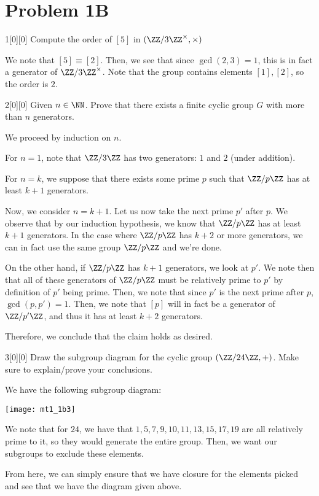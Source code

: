 \documentclass{article}
\begin{document}
\addtocounter{section}{-1}
\section{Problem 1B}
\begin{hw}{1}[0][0]
	Compute the order of $[5]$ in $(\ZZ/3\ZZ^{\times}, \times)$
\end{hw}
\begin{solution}
	We note that $[5] \equiv [2]$. Then, we see that since $\gcd(2, 3) = 1$, this is in fact a generator of $\ZZ/3\ZZ^{\times}$. Note that the group contains elements $[1], [2]$, so the order is $2$.
\end{solution}

\begin{hw}{2}[0][0]
	Given $n \in \NN$. Prove that there exists a finite cyclic group $G$ with more than $n$ generators.
\end{hw}
\begin{solution}
	We proceed by induction on $n$.
	
	For $n = 1$, note that $\ZZ/3\ZZ$ has two generators: $1$ and $2$ (under addition).
	
	For $n = k$, we suppose that there exists some prime $p$ such that $\ZZ/p\ZZ$ has at least $k + 1$ generators.
	
	Now, we consider $n = k+1$. Let us now take the next prime $p'$ after $p$. We observe that by our induction hypothesis, we know that $\ZZ/p\ZZ$ has at least $k + 1$ generators. In the case where $\ZZ/p\ZZ$ has $k + 2$ or more generators, we can in fact use the same group $\ZZ/p\ZZ$ and we're done.
	
	On the other hand, if $\ZZ/p\ZZ$ has $k+1$ generators, we look at $p'$. We note then that all of these generators of $\ZZ/p\ZZ$ must be relatively prime to $p'$ by definition of $p'$ being prime. Then, we note that since $p'$ is the next prime after $p$, $\gcd(p, p') = 1$. Then, we note that $[p]$ will in fact be a generator of $\ZZ/p'\ZZ$, and thus it has at least $k + 2$ generators.
	
	Therefore, we conclude that the claim holds as desired.
\end{solution}

\begin{hw}{3}[0][0]
	Draw the subgroup diagram for the cyclic group $(\ZZ/24\ZZ, +)$. Make sure to explain/prove your conclusions.
\end{hw}
\begin{solution}
	We have the following subgroup diagram:
	
	\begin{center}
	\texttt{[image: mt1\_1b3]}
	\end{center}

	
	We note that for $24$, we have that $1, 5, 7, 9, 10, 11, 13, 15, 17, 19$ are all relatively prime to it, so they would generate the entire group. Then, we want our subgroups to exclude these elements.
	
	From here, we can simply ensure that we have closure for the elements picked and see that we have the diagram given above.
\end{solution}
\end{document}
